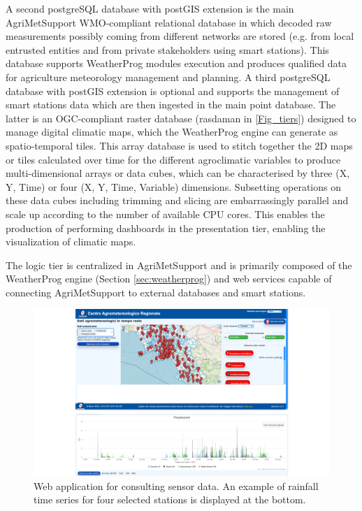 \documentclass[authoryear,preprint,review,12pt]{elsarticle}
\begin{document}
A second postgreSQL database with postGIS extension is the main Agri\-Met\-Support WMO-compliant relational database  in which decoded raw measurements possibly coming from different networks are stored (e.g. from local entrusted entities and from private stakeholders using smart stations).
This database supports WeatherProg modules execution and produces qualified data for agriculture meteorology management and planning.
A third postgreSQL database with postGIS extension is optional and supports the management of smart stations data which are then ingested in the main point database.
The latter is an OGC-compliant raster database (rasdaman in \cref{Fig_tiers}) designed to manage digital climatic maps, which the WeatherProg engine can generate as spatio-temporal tiles.
This array database is used to stitch together the 2D maps or tiles calculated over time for the different agroclimatic variables to produce multi-dimensional arrays or data cubes, which can be  characterised by three (X, Y, Time) or four (X, Y, Time, Variable) dimensions.
Subsetting operations on these data cubes including trimming and slicing are embarrassingly parallel and scale up according to the number of available CPU cores.
This enables the production of performing dashboards in the presentation tier, enabling the visualization of climatic maps.

The logic tier is centralized in Agri\-Met\-Support and is primarily composed of the WeatherProg engine (Section \ref{sec:weatherprog}) and web services capable of connecting Agri\-Met\-Support to external databases and smart stations.

\begin{figure}[!t] %
	\centering %
	\includegraphics[angle=0,scale=.4,trim=0cm 0cm 0cm 0cm,clip]{figures/Fig03_SensorDataConsultingApp.png}
	\caption{ Web application for consulting sensor data. 
              An example of rainfall time series for four selected stations is displayed at the bottom.}
	\label{Fig_webapp}
\end{figure}
\end{document}
